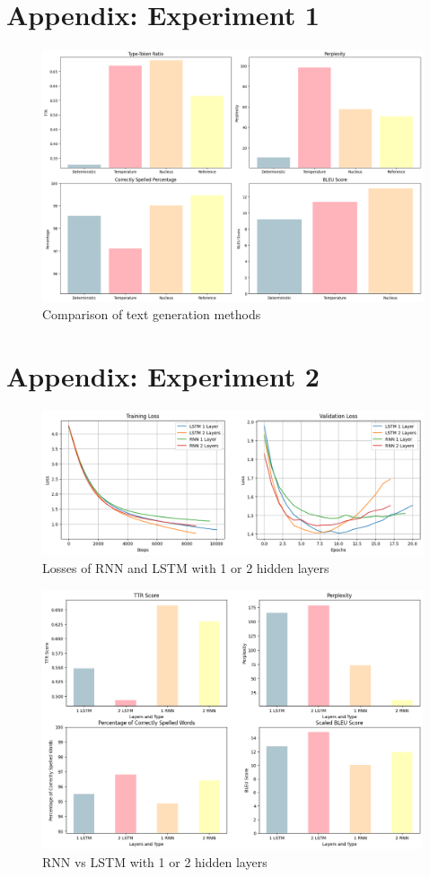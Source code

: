 \documentclass{article}
\begin{document}
\section*{Appendix: Experiment 1}
\begin{figure}[H]
    \centering
    \includegraphics[width=0.8\linewidth]{figures/text_generation.png}
    \caption{Comparison of text generation methods}
    \label{fig:text_generation}
\end{figure}

\section*{Appendix: Experiment 2}
\begin{figure}[H]
    \centering
    \includegraphics[width=\linewidth]{figures/RNN_LSTM_comparison.png}
    \caption{Losses of RNN and LSTM with 1 or 2 hidden layers}
    \label{fig:loss_rnn_lstm}
\end{figure}

\begin{figure}[H]
    \centering
    \includegraphics[width=0.8\linewidth]{figures/text_rnn_vs_lstm.png}
    \caption{RNN vs LSTM with 1 or 2 hidden layers}
    \label{fig:text_rnn_lstm}
\end{figure}
\end{document}
